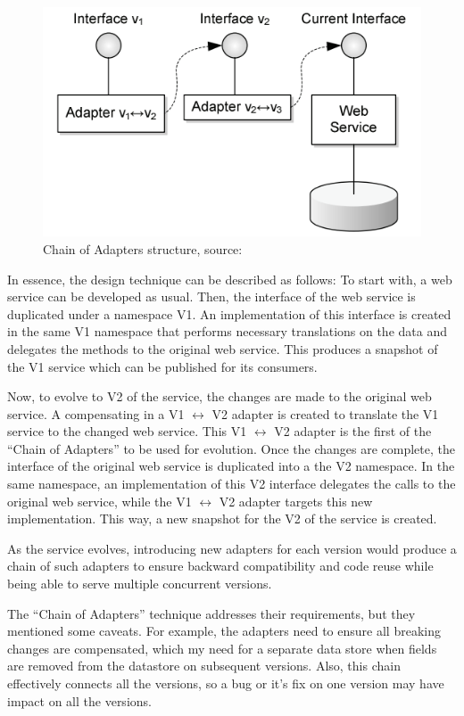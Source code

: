 \documentclass[runningheads,a4paper]{llncs}
\begin{document}
\begin{figure}[ht]
  \centering
  \includegraphics[width=\textwidth]{chain_of_adapters.png}
    \caption{Chain of Adapters structure, source: \cite{kaminski2006design}}
  \label{fig:chain_of_adapters}
\end{figure}

In essence, the design technique can be described as follows: To start with, a web service can be developed as usual. Then, the interface of the web service is duplicated under a namespace V1. An implementation of this interface is created in the same V1 namespace that performs necessary translations on the data and delegates the methods to the original web service. This produces a snapshot of the V1 service which can be published for its consumers.

Now, to evolve to V2 of the service, the changes are made to the original web service. A compensating in a V1 $\leftrightarrow$ V2 adapter is created to translate the V1 service to the changed web service. This V1 $\leftrightarrow$ V2 adapter is the first of the ``Chain of Adapters'' to be used for evolution. Once the changes are complete, the interface of the original web service is duplicated into a the V2 namespace. In the same namespace, an implementation of this V2 interface delegates the calls to the original web service, while the V1 $\leftrightarrow$ V2 adapter targets this new implementation. This way, a new snapshot for the V2 of the service is created.

As the service evolves, introducing new adapters for each version would produce a chain of such adapters to ensure backward compatibility and code reuse while being able to serve multiple concurrent versions.

The ``Chain of Adapters'' technique addresses their requirements, but they mentioned some caveats. For example, the adapters need to ensure all breaking changes are compensated, which my need for a separate data store when fields are removed from the datastore on subsequent versions. Also, this chain effectively connects all the versions, so a bug or it’s fix on one version may have impact on all the versions.
\end{document}
